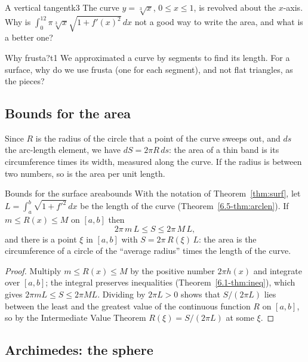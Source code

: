 \documentclass[11pt]{article}
\begin{document}
\begin{kc}{A vertical tangent}{k3}
The curve $y=\sqrt[3]{x}$, $0\le x\le1$, is revolved about the $x$-axis. Why is $\int_0^12\pi\sqrt[3]{x}\sqrt{1+f'(x)^2}\,dx$ not a good way to write the area, and what is a better one?
\end{kc}

\begin{think}{Why frusta?}{t1}
We approximated a curve by segments to find its length. For a surface, why do we use frusta (one for each segment), and not flat triangles, as the pieces?
\end{think}

\subsection*{Bounds for the area}

Since $R$ is the radius of the circle that a point of the curve sweeps out, and $ds$ the arc-length element, we have $dS=2\pi R\,ds$: the area of a thin band is its circumference times its width, measured along the curve. If the radius is between two numbers, so is the area per unit length.

\begin{thm}{Bounds for the surface area}{bounds}
With the notation of Theorem~\ref{thm:surf}, let $L=\int_a^b\sqrt{1+f'^2}\,dx$ be the length of the curve (Theorem~\ref{6.5-thm:arclen}). If $m\le R(x)\le M$ on $[a,b]$ then
\[
2\pi\,m\,L\le S\le2\pi\,M\,L ,
\]
and there is a point $\xi$ in $[a,b]$ with $S=2\pi\,R(\xi)\,L$: the area is the circumference of a circle of the ``average radius'' times the length of the curve.
\end{thm}
\begin{proof}
Multiply $m\le R(x)\le M$ by the positive number $2\pi h(x)$ and integrate over $[a,b]$; the integral preserves inequalities (Theorem~\ref{6.1-thm:ineq}), which gives $2\pi mL\le S\le2\pi ML$. Dividing by $2\pi L>0$ shows that $S/(2\pi L)$ lies between the least and the greatest value of the continuous function $R$ on $[a,b]$, so by the Intermediate Value Theorem $R(\xi)=S/(2\pi L)$ at some $\xi$.
\end{proof}

\subsection*{Archimedes: the sphere}
\end{document}
